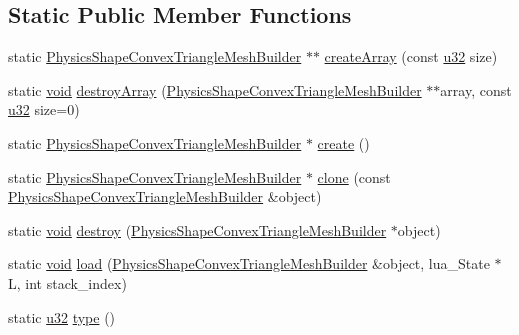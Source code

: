\subsection*{Static Public Member Functions}
\begin{DoxyCompactItemize}
\item 
static \mbox{\hyperlink{classnjli_1_1_physics_shape_convex_triangle_mesh_builder}{Physics\+Shape\+Convex\+Triangle\+Mesh\+Builder}} $\ast$$\ast$ \mbox{\hyperlink{classnjli_1_1_physics_shape_convex_triangle_mesh_builder_aecf73b56d238ebcf729bef55c465df76}{create\+Array}} (const \mbox{\hyperlink{_util_8h_a10e94b422ef0c20dcdec20d31a1f5049}{u32}} size)
\item 
static \mbox{\hyperlink{_thread_8h_af1e856da2e658414cb2456cb6f7ebc66}{void}} \mbox{\hyperlink{classnjli_1_1_physics_shape_convex_triangle_mesh_builder_a43ee83f6a793dccd51ff3cabf863bdfa}{destroy\+Array}} (\mbox{\hyperlink{classnjli_1_1_physics_shape_convex_triangle_mesh_builder}{Physics\+Shape\+Convex\+Triangle\+Mesh\+Builder}} $\ast$$\ast$array, const \mbox{\hyperlink{_util_8h_a10e94b422ef0c20dcdec20d31a1f5049}{u32}} size=0)
\item 
static \mbox{\hyperlink{classnjli_1_1_physics_shape_convex_triangle_mesh_builder}{Physics\+Shape\+Convex\+Triangle\+Mesh\+Builder}} $\ast$ \mbox{\hyperlink{classnjli_1_1_physics_shape_convex_triangle_mesh_builder_ab54cd53cea3bb8901d3766f5f8d8f9ac}{create}} ()
\item 
static \mbox{\hyperlink{classnjli_1_1_physics_shape_convex_triangle_mesh_builder}{Physics\+Shape\+Convex\+Triangle\+Mesh\+Builder}} $\ast$ \mbox{\hyperlink{classnjli_1_1_physics_shape_convex_triangle_mesh_builder_a2d54c76e2d2f68dc21107049d8977aec}{clone}} (const \mbox{\hyperlink{classnjli_1_1_physics_shape_convex_triangle_mesh_builder}{Physics\+Shape\+Convex\+Triangle\+Mesh\+Builder}} \&object)
\item 
static \mbox{\hyperlink{_thread_8h_af1e856da2e658414cb2456cb6f7ebc66}{void}} \mbox{\hyperlink{classnjli_1_1_physics_shape_convex_triangle_mesh_builder_a012065225d40d29736a27eeb58fc0b4a}{destroy}} (\mbox{\hyperlink{classnjli_1_1_physics_shape_convex_triangle_mesh_builder}{Physics\+Shape\+Convex\+Triangle\+Mesh\+Builder}} $\ast$object)
\item 
static \mbox{\hyperlink{_thread_8h_af1e856da2e658414cb2456cb6f7ebc66}{void}} \mbox{\hyperlink{classnjli_1_1_physics_shape_convex_triangle_mesh_builder_a6cf26fd7cccaab4201d5edf28e3657b2}{load}} (\mbox{\hyperlink{classnjli_1_1_physics_shape_convex_triangle_mesh_builder}{Physics\+Shape\+Convex\+Triangle\+Mesh\+Builder}} \&object, lua\+\_\+\+State $\ast$L, int stack\+\_\+index)
\item 
static \mbox{\hyperlink{_util_8h_a10e94b422ef0c20dcdec20d31a1f5049}{u32}} \mbox{\hyperlink{classnjli_1_1_physics_shape_convex_triangle_mesh_builder_a0dade1bcadeba5142bed3d507bd6dbbb}{type}} ()
\end{DoxyCompactItemize}

